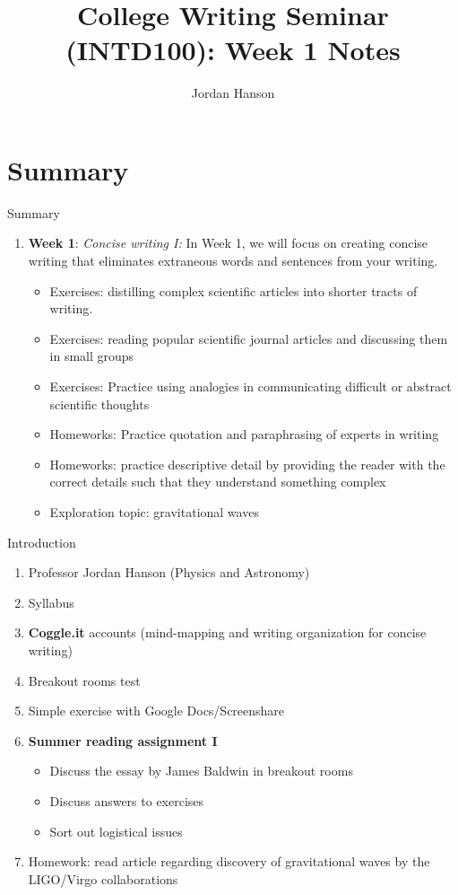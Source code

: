 \documentclass{beamer}
\title{College Writing Seminar (INTD100): Week 1 Notes}
\author{Jordan Hanson}
\institute{Whittier College Department of Physics and Astronomy}
\begin{document}
\maketitle

\section{Summary}

\begin{frame}{Summary}
\begin{enumerate}
\item \textbf{Week 1}: \textit{Concise writing I:} In Week 1, we will focus on creating concise writing that eliminates extraneous words and sentences from your writing.
\begin{itemize}
\item Exercises: distilling complex scientific articles into shorter tracts of writing.
\item Exercises: reading popular scientific journal articles and discussing them in small groups
\item Exercises: Practice using analogies in communicating difficult or abstract scientific thoughts
\item Homeworks: Practice quotation and paraphrasing of experts in writing
\item Homeworks: practice descriptive detail by providing the reader with the correct details such that they understand something complex
\item Exploration topic: gravitational waves
\end{itemize}
\end{enumerate}
\end{frame}

\begin{frame}{Introduction}
\begin{enumerate}
\item Professor Jordan Hanson (Physics and Astronomy)
\item Syllabus
\item \alert{\textbf{Coggle.it}} accounts (mind-mapping and writing organization for concise writing)
\item Breakout rooms test
\item Simple exercise with Google Docs/Screenshare
\item \textbf{Summer reading assignment I}
\begin{itemize}
\item Discuss the essay by James Baldwin in breakout rooms
\item Discuss answers to exercises
\item Sort out logistical issues
\end{itemize}
\item Homework: read article regarding discovery of gravitational waves by the LIGO/Virgo collaborations
\end{enumerate}
\end{frame}
\end{document}
